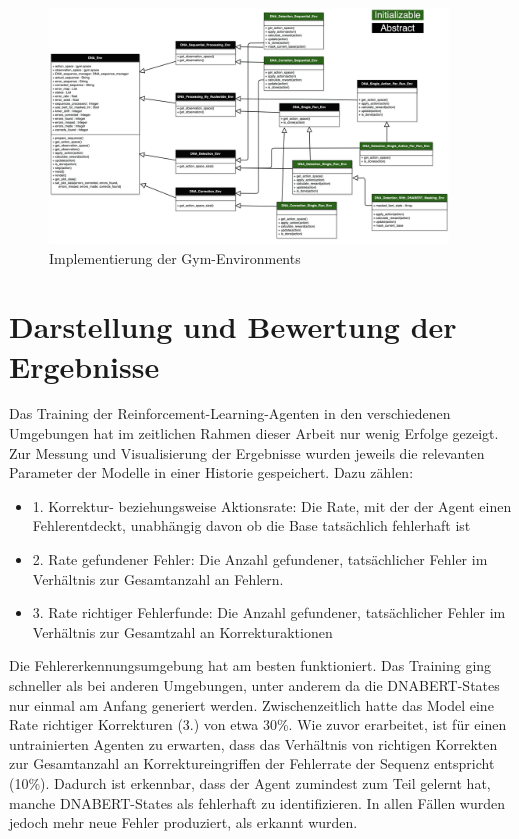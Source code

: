 \documentclass[oneside,bibliography=totocnumbered,BCOR=5mm]{scrbook}%
\theoremstyle{definition}
\theoremstyle{definition}
\theoremstyle{definition}
\theoremstyle{definition}
\theoremstyle{definition}
\theoremstyle{definition}
\begin{document}
\begin{figure}[h]
  \centering
  \includegraphics[width=400px,keepaspectratio]{images/classes.png}
  \caption{Implementierung der Gym-Environments}
  \label{gymClasses}
\end{figure}

\chapter{Darstellung und Bewertung der Ergebnisse}
Das Training der Reinforcement-Learning-Agenten in den verschiedenen Umgebungen hat im 
zeitlichen Rahmen dieser Arbeit nur wenig Erfolge gezeigt.
Zur Messung und Visualisierung der Ergebnisse wurden jeweils die relevanten Parameter der Modelle 
in einer Historie gespeichert. Dazu zählen:  \\

\begin{itemize}
  \item 1. Korrektur- beziehungsweise Aktionsrate: Die Rate, mit der der Agent einen Fehlerentdeckt, 
  unabhängig davon ob die Base tatsächlich fehlerhaft ist
  \item 2. Rate gefundener Fehler: Die Anzahl gefundener, tatsächlicher Fehler im Verhältnis 
  zur Gesamtanzahl an Fehlern.
  \item 3. Rate richtiger Fehlerfunde: Die Anzahl gefundener, tatsächlicher Fehler im Verhältnis zur
  Gesamtzahl an Korrekturaktionen
\end{itemize}

Die Fehlererkennungsumgebung hat am besten funktioniert. Das Training ging schneller als bei
anderen Umgebungen, unter anderem da die DNABERT-States nur einmal am Anfang generiert werden.
Zwischenzeitlich hatte das Model eine Rate richtiger Korrekturen (3.) von etwa 30\%. 
Wie zuvor erarbeitet, ist für einen untrainierten Agenten zu erwarten, dass das Verhältnis von 
richtigen Korrekten zur Gesamtanzahl an Korrektureingriffen der Fehlerrate der Sequenz entspricht (10\%).
Dadurch ist erkennbar, dass der Agent zumindest zum Teil gelernt hat, manche DNABERT-States 
als fehlerhaft zu identifizieren. In allen Fällen wurden jedoch mehr neue Fehler produziert,
als erkannt wurden. \\
\end{document}
